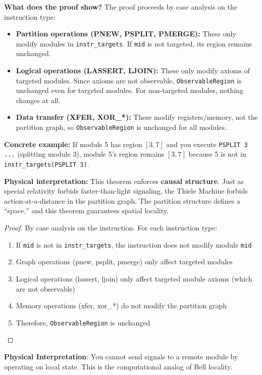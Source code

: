 \textbf{What does the proof show?} The proof proceeds by case analysis on the instruction type:
\begin{itemize}
    \item \textbf{Partition operations (PNEW, PSPLIT, PMERGE):} These only modify modules in \texttt{instr\_targets}. If \texttt{mid} is not targeted, its region remains unchanged.
    \item \textbf{Logical operations (LASSERT, LJOIN):} These only modify axioms of targeted modules. Since axioms are not observable, \texttt{ObservableRegion} is unchanged even for targeted modules. For non-targeted modules, nothing changes at all.
    \item \textbf{Data transfer (XFER, XOR\_*):} These modify registers/memory, not the partition graph, so \texttt{ObservableRegion} is unchanged for all modules.
\end{itemize}

\textbf{Concrete example:} If module 5 has region $[3, 7]$ and you execute \texttt{PSPLIT 3 ...} (splitting module 3), module 5's region remains $[3, 7]$ because 5 is not in \texttt{instr\_targets(PSPLIT 3)}.

\textbf{Physical interpretation:} This theorem enforces \textbf{causal structure}. Just as special relativity forbids faster-than-light signaling, the Thiele Machine forbids action-at-a-distance in the partition graph. The partition structure defines a ``space,'' and this theorem guarantees spatial locality.


\begin{proof}
By case analysis on the instruction. For each instruction type:
\begin{enumerate}
    \item If \texttt{mid} is not in \texttt{instr\_targets}, the instruction does not modify module \texttt{mid}
    \item Graph operations (pnew, psplit, pmerge) only affect targeted modules
    \item Logical operations (lassert, ljoin) only affect targeted module axioms (which are not observable)
    \item Memory operations (xfer, xor\_*) do not modify the partition graph
    \item Therefore, \texttt{ObservableRegion} is unchanged
\end{enumerate}
\end{proof}

\textbf{Physical Interpretation}: You cannot send signals to a remote module by operating on local state. This is the computational analog of Bell locality.

